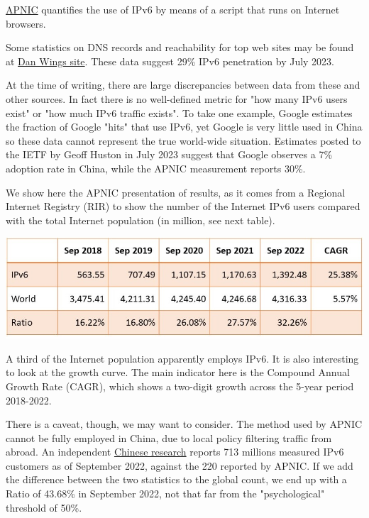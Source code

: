 \documentclass[
]{article}
\begin{document}
\href{https://stats.labs.apnic.net/ipv6}{APNIC} quantifies the use of
IPv6 by means of a script that runs on Internet browsers.

Some statistics on DNS records and reachability for top web sites may be
found at \href{https://www.employees.org/~dwing/aaaa-stats/}{Dan
Wing\textquotesingle s site}. These data suggest 29\% IPv6 penetration
by July 2023.

At the time of writing, there are large discrepancies between data from
these and other sources. In fact there is no well-defined metric for
"how many IPv6 users exist" or "how much IPv6 traffic exists". To take
one example, Google estimates the fraction of Google "hits" that use
IPv6, yet Google is very little used in China so these data cannot
represent the true world-wide situation. Estimates posted to the IETF by
Geoff Huston in July 2023 suggest that Google observes a 7\% adoption
rate in China, while the APNIC measurement reports 30\%.

We show here the APNIC presentation of results, as it comes from a
Regional Internet Registry (RIR) to show the number of the Internet IPv6
users compared with the total Internet population (in million, see next
table).

\includegraphics{Section5_Table1.jpg}

A third of the Internet population apparently employs IPv6. It is also
interesting to look at the growth curve. The main indicator here is the
Compound Annual Growth Rate (CAGR), which shows a two-digit growth
across the 5-year period 2018-2022.

There is a caveat, though, we may want to consider. The method used by
APNIC cannot be fully employed in China, due to local policy filtering
traffic from abroad. An independent
\href{https://www.china-ipv6.cn/\#/activeconnect/simpleInfo}{Chinese
research} reports 713 millions measured IPv6 customers as of September
2022, against the 220 reported by APNIC. If we add the difference
between the two statistics to the global count, we end up with a Ratio
of 43.68\% in September 2022, not that far from the "psychological"
threshold of 50\%.
\end{document}
